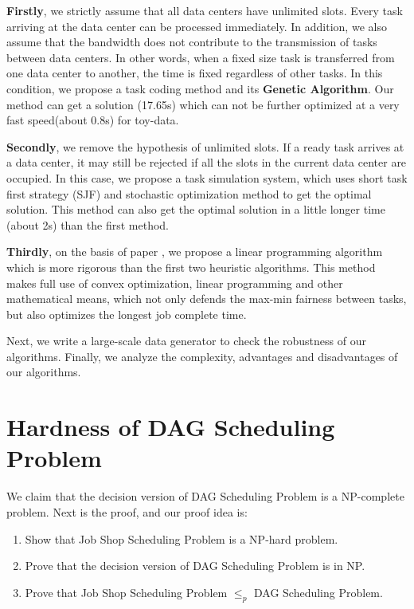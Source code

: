 \documentclass{llncs}
\begin{document}
    \textbf{Firstly}, we strictly assume that all data centers have unlimited slots. Every task arriving at the data center can be processed immediately. In addition, we also assume that the bandwidth does not contribute to the transmission of tasks between data centers. In other words, when a fixed size task is transferred from one data center to another, the time is fixed regardless of other tasks. In this condition, we propose a task coding method and its {\bf Genetic Algorithm}. Our method can get a solution (17.65s) which can not be further optimized at a very fast speed(about 0.8s) for toy-data.

    \textbf{Secondly}, we remove the hypothesis of unlimited slots. If a ready task arrives at a data center, it may still be rejected if all the slots in the current data center are occupied. In this case, we propose a task simulation system, which uses short task first strategy (SJF) and stochastic optimization method to get the optimal solution. This method can also get the optimal solution in a little longer time (about 2s) than the first method.
    
    \textbf{Thirdly}, on the basis of paper \cite{ref_11}, we propose a linear programming algorithm which is more rigorous than the first two heuristic algorithms. This method makes full use of convex optimization, linear programming and other mathematical means, which not only defends the max-min fairness between tasks, but also optimizes the longest job complete time.

    Next, we write a large-scale data generator to check the robustness of our algorithms. Finally, we analyze the complexity, advantages and disadvantages of our algorithms.
    
\section{Hardness of DAG Scheduling Problem}

We claim that the decision version of DAG Scheduling Problem is a NP-complete problem. Next is the proof, and our proof idea is:
\begin{enumerate}
    \item Show that Job Shop Scheduling Problem is a NP-hard problem.
    \item Prove that the decision version of DAG Scheduling Problem is in NP.
    \item Prove that Job Shop Scheduling Problem $\le_p$ DAG Scheduling Problem.
\end{enumerate}
\end{document}

